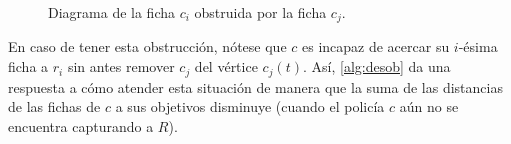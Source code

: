 \begin{figure}[h]
    \centering
    \caption{Diagrama de la ficha $c_i$ obstruida por la ficha $c_j$.}
    \label{fig:obstruccion}
\end{figure}

En caso de tener esta obstrucci\'on, n\'otese que $c$ es incapaz de acercar su
$i$-\'esima ficha a $r_i$ sin antes remover $c_j$ del v\'ertice $c_j(t)$. As\'i,
\cref{alg:desob} da una respuesta a c\'omo atender esta situaci\'on de manera
que la suma de las distancias de las fichas de $c$ a sus objetivos disminuye
(cuando el polic\'ia $c$ a\'un no se encuentra capturando a $R$).


